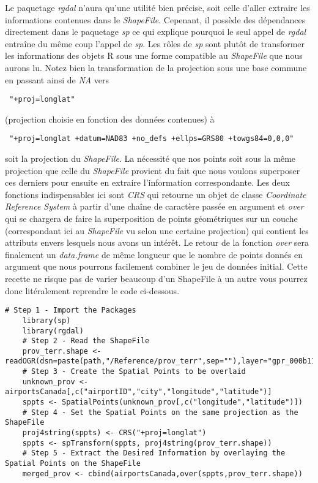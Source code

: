 \noindent
Le paquetage \emph{rgdal} n'aura qu'une utilité bien précise, soit celle d'aller extraire les informations contenues dans le \emph{ShapeFile}. Cepenant, il possède des dépendances directement dans le paquetage \emph{sp} ce qui explique pourquoi le seul appel de \emph{rgdal} entraîne du même coup l'appel de \emph{sp}. Les rôles de \emph{sp} sont plutôt de transformer les informations des objets R sous une forme compatible au \emph{ShapeFile} que nous aurons lu. Notez bien la transformation de la projection sous une base commune en passant ainsi de \emph{NA} vers \begin{verbatim} "+proj=longlat" \end{verbatim} (projection choisie en fonction des données contenues) à \begin{verbatim} "+proj=longlat +datum=NAD83 +no_defs +ellps=GRS80 +towgs84=0,0,0" \end{verbatim} soit la projection du \emph{ShapeFile}. La nécessité que nos points soit sous la même projection que celle du \emph{ShapeFile} provient du fait que nous voulons superposer ces derniers pour ensuite en extraire l'information correspondante. Les deux fonctions indispensables ici sont \emph{CRS} qui retourne un objet de classe \emph{Coordinate Reference System} à partir d'une chaîne de caractère passée en argument et \emph{over} qui se chargera de faire la superposition de points géométriques sur un couche (correspondant ici au \emph{ShapeFile} vu selon une certaine projection) qui contient les attributs envers lesquels nous avons un intérêt. Le retour de la fonction \emph{over} sera finalement un \emph{data.frame} de même longueur que le nombre de points donnés en argument que nous pourrons facilement combiner le jeu de données initial. Cette recette ne risque pas de varier beaucoup d'un ShapeFile à un autre vous pourrez donc litéralement reprendre le code ci-dessous. \\

\begin{lstlisting}[caption = Filtrer les données,label=src:Filter]
	# Step 1 - Import the Packages	
	library(sp)
	library(rgdal)
	# Step 2 - Read the ShapeFile
	prov_terr.shape <- readOGR(dsn=paste(path,"/Reference/prov_terr",sep=""),layer="gpr_000b11a_e")
	# Step 3 - Create the Spatial Points to be overlaid
	unknown_prov <- airportsCanada[,c("airportID","city","longitude","latitude")]
	sppts <- SpatialPoints(unknown_prov[,c("longitude","latitude")])
	# Step 4 - Set the Spatial Points on the same projection as the ShapeFile
	proj4string(sppts) <- CRS("+proj=longlat")
	sppts <- spTransform(sppts, proj4string(prov_terr.shape))
	# Step 5 - Extract the Desired Information by overlaying the Spatial Points on the ShapeFile
	merged_prov <- cbind(airportsCanada,over(sppts,prov_terr.shape))
\end{lstlisting}

